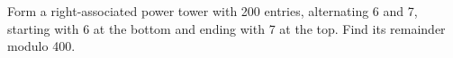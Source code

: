 Form a right-associated power tower with 200 entries, alternating 6 and 7, starting with 6 at the bottom and ending with 7 at the top. Find its remainder modulo 400.
